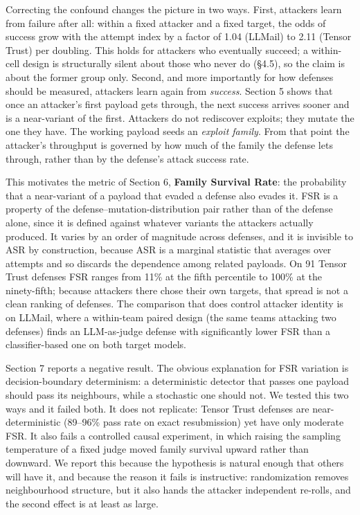 \documentclass[conference]{IEEEtran}
\begin{document}
Correcting the confound changes the picture in two ways. First, attackers learn from failure after all: within a fixed attacker and a fixed target, the odds of success grow with the attempt index by a factor of 1.04 (LLMail) to 2.11 (Tensor Trust) per doubling. This holds for attackers who eventually succeed; a within-cell design is structurally silent about those who never do (\S4.5), so the claim is about the former group only. Second, and more importantly for how defenses should be measured, attackers learn again from \textit{success}. Section 5 shows that once an attacker's first payload gets through, the next success arrives sooner and is a near-variant of the first. Attackers do not rediscover exploits; they mutate the one they have. The working payload seeds an \textit{exploit family}. From that point the attacker's throughput is governed by how much of the family the defense lets through, rather than by the defense's attack success rate.

This motivates the metric of Section 6, \textbf{Family Survival Rate}: the probability that a near-variant of a payload that evaded a defense also evades it. FSR is a property of the defense--mutation-distribution pair rather than of the defense alone, since it is defined against whatever variants the attackers actually produced. It varies by an order of magnitude across defenses, and it is invisible to ASR by construction, because ASR is a marginal statistic that averages over attempts and so discards the dependence among related payloads. On 91 Tensor Trust defenses FSR ranges from 11\% at the fifth percentile to 100\% at the ninety-fifth; because attackers there chose their own targets, that spread is not a clean ranking of defenses. The comparison that does control attacker identity is on LLMail, where a within-team paired design (the same teams attacking two defenses) finds an LLM-as-judge defense with significantly lower FSR than a classifier-based one on both target models.

Section 7 reports a negative result. The obvious explanation for FSR variation is decision-boundary determinism: a deterministic detector that passes one payload should pass its neighbours, while a stochastic one should not. We tested this two ways and it failed both. It does not replicate: Tensor Trust defenses are near-deterministic (89--96\% pass rate on exact resubmission) yet have only moderate FSR. It also fails a controlled causal experiment, in which raising the sampling temperature of a fixed judge moved family survival upward rather than downward. We report this because the hypothesis is natural enough that others will have it, and because the reason it fails is instructive: randomization removes neighbourhood structure, but it also hands the attacker independent re-rolls, and the second effect is at least as large.
\end{document}
